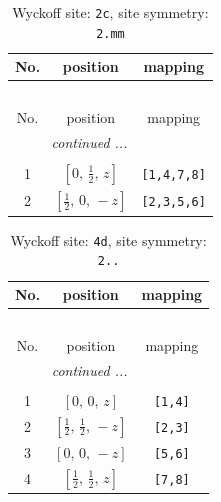 \documentclass[fleqn,8pt]{jsarticle}
\begin{document}
\renewcommand{\arraystretch}{1.2}
\begin{longtable}{ccc}
\caption{Wyckoff site: {\tt 2c}, site symmetry: {\tt 2.mm}}
 \\
 \hline \hline
No. & position & mapping \\ \hline \endfirsthead

\multicolumn{2}{l}{\tablename\ \thetable{}} \\
 \hline \hline
No. & position & mapping \\ \hline \endhead

 \hline \hline
\multicolumn{2}{r}{\footnotesize\it continued ...} \\ \endfoot

 \hline \hline
\multicolumn{2}{r}{} \\ \endlastfoot

1 & $\left[ 0,\, \frac{1}{2},\, z \right]$ & {\tt [1,4,7,8]} \\ \hline
2 & $\left[ \frac{1}{2},\, 0,\, - z \right]$ & {\tt [2,3,5,6]} \\
\end{longtable}
\renewcommand{\arraystretch}{1.2}
\begin{longtable}{ccc}
\caption{Wyckoff site: {\tt 4d}, site symmetry: {\tt 2..}}
 \\
 \hline \hline
No. & position & mapping \\ \hline \endfirsthead

\multicolumn{2}{l}{\tablename\ \thetable{}} \\
 \hline \hline
No. & position & mapping \\ \hline \endhead

 \hline \hline
\multicolumn{2}{r}{\footnotesize\it continued ...} \\ \endfoot

 \hline \hline
\multicolumn{2}{r}{} \\ \endlastfoot

1 & $\left[ 0,\, 0,\, z \right]$ & {\tt [1,4]} \\ \hline
2 & $\left[ \frac{1}{2},\, \frac{1}{2},\, - z \right]$ & {\tt [2,3]} \\ \hline
3 & $\left[ 0,\, 0,\, - z \right]$ & {\tt [5,6]} \\ \hline
4 & $\left[ \frac{1}{2},\, \frac{1}{2},\, z \right]$ & {\tt [7,8]} \\
\end{longtable}
\renewcommand{\arraystretch}{1.2}
\end{document}
